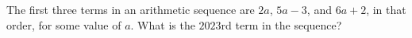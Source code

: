 The first three terms in an arithmetic sequence are $2a$, $5a-3$, and $6a+2$, in that order, for some value of $a$. What is the $2023$rd term in the sequence?
